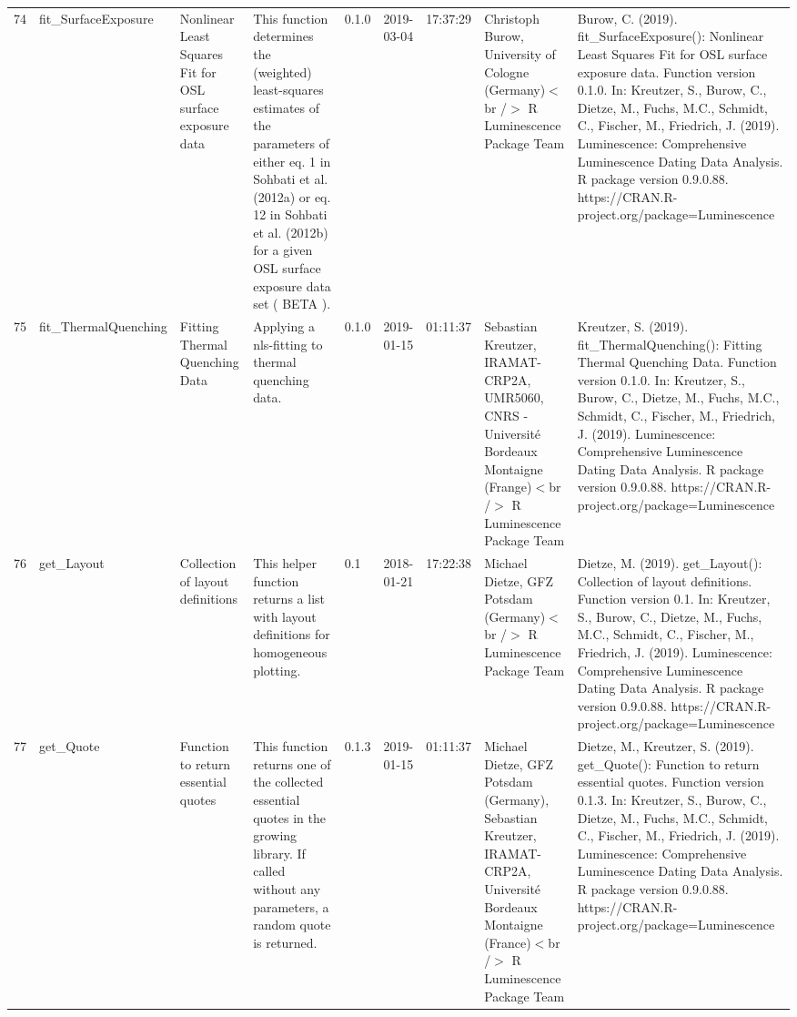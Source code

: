 \begin{table}[ht]
\begin{tabular}{rllllllll}
 \\ 
  74 & fit\_SurfaceExposure & Nonlinear Least Squares Fit for OSL surface exposure data & This function determines the (weighted) least-squares estimates of the parameters of either eq. 1 in  Sohbati et al. (2012a)  or eq. 12 in Sohbati et al. (2012b)  for a given OSL surface exposure data set ( BETA ). & 0.1.0 & 2019-03-04 & 17:37:29
 & Christoph Burow, University of Cologne (Germany)$<$br /$>$  R Luminescence Package Team & Burow, C. (2019). fit\_SurfaceExposure(): Nonlinear Least Squares Fit for OSL surface exposure data. Function version 0.1.0. In: Kreutzer, S., Burow, C., Dietze, M., Fuchs, M.C., Schmidt, C., Fischer, M., Friedrich, J. (2019). Luminescence: Comprehensive Luminescence Dating Data Analysis. R package version 0.9.0.88. https://CRAN.R-project.org/package=Luminescence
 \\ 
  75 & fit\_ThermalQuenching & Fitting Thermal Quenching Data & Applying a nls-fitting to thermal quenching data. & 0.1.0 & 2019-01-15 & 01:11:37
 & Sebastian Kreutzer, IRAMAT-CRP2A, UMR5060, CNRS - Université Bordeaux Montaigne (Frange)$<$br /$>$  R Luminescence Package Team & Kreutzer, S. (2019). fit\_ThermalQuenching(): Fitting Thermal Quenching Data. Function version 0.1.0. In: Kreutzer, S., Burow, C., Dietze, M., Fuchs, M.C., Schmidt, C., Fischer, M., Friedrich, J. (2019). Luminescence: Comprehensive Luminescence Dating Data Analysis. R package version 0.9.0.88. https://CRAN.R-project.org/package=Luminescence
 \\ 
  76 & get\_Layout & Collection of layout definitions & This helper function returns a list with layout definitions for homogeneous plotting. & 0.1 & 2018-01-21 & 17:22:38
 & Michael Dietze, GFZ Potsdam (Germany)$<$br /$>$  R Luminescence Package Team & Dietze, M. (2019). get\_Layout(): Collection of layout definitions. Function version 0.1. In: Kreutzer, S., Burow, C., Dietze, M., Fuchs, M.C., Schmidt, C., Fischer, M., Friedrich, J. (2019). Luminescence: Comprehensive Luminescence Dating Data Analysis. R package version 0.9.0.88. https://CRAN.R-project.org/package=Luminescence
 \\ 
  77 & get\_Quote & Function to return essential quotes & This function returns one of the collected essential quotes in the growing library. If called without any parameters, a random quote is returned. & 0.1.3 & 2019-01-15 & 01:11:37
 & Michael Dietze, GFZ Potsdam (Germany), Sebastian Kreutzer, IRAMAT-CRP2A, Université Bordeaux Montaigne (France)$<$br /$>$  R Luminescence Package Team & Dietze, M., Kreutzer, S. (2019). get\_Quote(): Function to return essential quotes. Function version 0.1.3. In: Kreutzer, S., Burow, C., Dietze, M., Fuchs, M.C., Schmidt, C., Fischer, M., Friedrich, J. (2019). Luminescence: Comprehensive Luminescence Dating Data Analysis. R package version 0.9.0.88. https://CRAN.R-project.org/package=Luminescence

\end{tabular}
\end{table}
